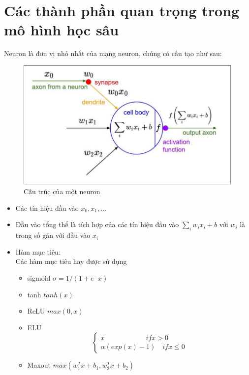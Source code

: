 \documentclass[a4paper,12pt]{report}
\begin{document}
\section{Các thành phần quan trọng trong mô hình học sâu}
Neuron là đơn vị nhỏ nhất của mạng neuron, chúng có cấu tạo như sau: 
\begin{figure}[H]
\includegraphics[scale=0.45]{aneuron.png}
\caption{Cấu trúc của một neuron}

\end{figure}
\begin{itemize}
\item Các tín hiệu đầu vào $x_0,x_1,...$
\item Đầu vào tổng thể là tích hợp của các tín hiệu đầu vào $ \sum_i w_ix_i+b$ với  $w_i$ là trong số gán với đầu vào $x_i$

\item Hàm mục tiêu:\\ Các hàm mục tiêu hay được sử dụng \begin{itemize}
\item sigmoid $\sigma =1/(1+e^-x)$
\item tanh $ tanh(x)$
\item ReLU $ max(0,x)$
\item ELU \abovedisplayskip=0pt\relax
\begin{equation}
\begin{cases}
x \qquad \qquad \qquad  if x>0\\ \alpha (exp(x)-1) \quad if x \leq 0
\end{cases}
\end{equation}
\item Maxout $max(w_1^T x+b_1,w_2^T x+b_2) $

\end{itemize}
\end{itemize}
\end{document}
